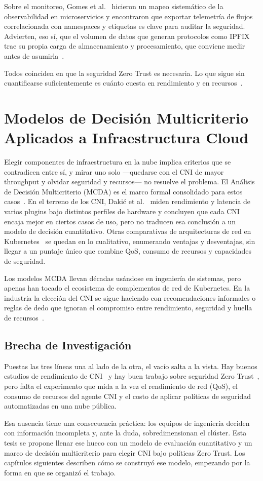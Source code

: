 Sobre el monitoreo, Gomes et al.~\cite{ref6} hicieron un mapeo sistemático de la observabilidad en microservicios y encontraron que exportar telemetría de flujos correlacionada con namespaces y etiquetas es clave para auditar la seguridad. Advierten, eso sí, que el volumen de datos que generan protocolos como IPFIX trae su propia carga de almacenamiento y procesamiento, que conviene medir antes de asumirla~\cite{ref23}.

Todos coinciden en que la seguridad Zero Trust es necesaria. Lo que sigue sin cuantificarse suficientemente es cuánto cuesta en rendimiento y en recursos~\cite{ref24,ref26}.

\section{Modelos de Decisión Multicriterio Aplicados a Infraestructura Cloud}

Elegir componentes de infraestructura en la nube implica criterios que se contradicen entre sí, y mirar uno solo ---quedarse con el CNI de mayor throughput y olvidar seguridad y recursos--- no resuelve el problema. El Análisis de Decisión Multicriterio (MCDA) es el marco formal consolidado para estos casos~\cite{ref34}. En el terreno de los CNI, Daki\'c et al.~\cite{ref9} miden rendimiento y latencia de varios plugins bajo distintos perfiles de hardware y concluyen que cada CNI encaja mejor en ciertos casos de uso, pero no traducen esa conclusión a un modelo de decisión cuantitativo. Otras comparativas de arquitecturas de red en Kubernetes~\cite{ref14,ref15} se quedan en lo cualitativo, enumerando ventajas y desventajas, sin llegar a un puntaje único que combine QoS, consumo de recursos y capacidades de seguridad.

Los modelos MCDA llevan décadas usándose en ingeniería de sistemas, pero apenas han tocado el ecosistema de complementos de red de Kubernetes. En la industria la elección del CNI se sigue haciendo con recomendaciones informales o reglas de dedo que ignoran el compromiso entre rendimiento, seguridad y huella de recursos~\cite{ref7,ref8}.

\subsection{Brecha de Investigación}

Puestas las tres líneas una al lado de la otra, el vacío salta a la vista. Hay buenos estudios de rendimiento de CNI~\cite{ref7,ref8} y hay buen trabajo sobre seguridad Zero Trust~\cite{ref24,ref26}, pero falta el experimento que mida a la vez el rendimiento de red (QoS), el consumo de recursos del agente CNI y el costo de aplicar políticas de seguridad automatizadas en una nube pública.

Esa ausencia tiene una consecuencia práctica: los equipos de ingeniería deciden con información incompleta y, ante la duda, sobredimensionan el clúster. Esta tesis se propone llenar ese hueco con un modelo de evaluación cuantitativo y un marco de decisión multicriterio para elegir CNI bajo políticas Zero Trust. Los capítulos siguientes describen cómo se construyó ese modelo, empezando por la forma en que se organizó el trabajo.
